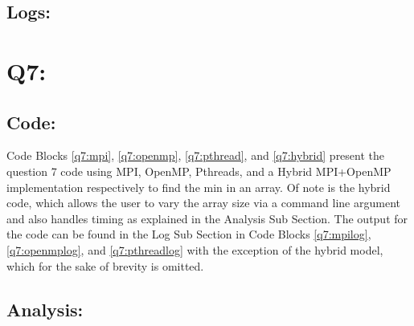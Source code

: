 \documentclass[11pt]{article}
\begin{document}


\subsection*{Logs:}


\section*{Q7:}

\subsection*{Code:}
Code Blocks \ref{q7:mpi}, \ref{q7:openmp}, \ref{q7:pthread}, and \ref{q7:hybrid} present the question 7 code using MPI, OpenMP, Pthreads, and a Hybrid MPI+OpenMP implementation respectively to find the min in an array.
Of note is the hybrid code, which allows the user to vary the array size via a command line argument and also handles timing as explained in the Analysis Sub Section.
The output for the code can be found in the Log Sub Section in Code Blocks \ref{q7:mpilog}, \ref{q7:openmplog}, and \ref{q7:pthreadlog} with the exception of the hybrid model, which for the sake of brevity is omitted.






\subsection*{Analysis:}
\end{document}
